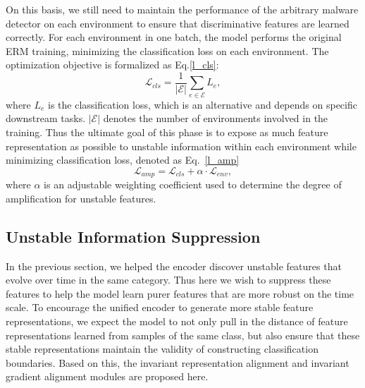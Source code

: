 On this basis, we still need to maintain the performance of the arbitrary malware detector on each environment to ensure that discriminative features are learned correctly. For each environment in one batch, the model performs the original ERM training, minimizing the classification loss on each environment. The optimization objective is formalized as Eq.\ref{l_cls}:
\begin{equation}
\label{l_cls}
\mathcal{L}_{cls} = \frac{1}{|\mathcal{E}|} \sum_{e \in \mathcal{E}} L_{e},
\end{equation}
where $L_{e}$ is the classification loss, which is an alternative and depends on specific downstream tasks. $|\mathcal{E}|$ denotes the number of environments involved in the training. Thus the ultimate goal of this phase is to expose as much feature representation as possible to unstable information within each environment while minimizing classification loss, denoted as Eq.~\ref{l_amp}
\begin{equation}
\label{l_amp}
\mathcal{L}_{amp} = \mathcal{L}_{cls} + \alpha \cdot \mathcal{L}_{env},
\end{equation}
where $\alpha$ is an adjustable weighting coefficient used to determine the degree of amplification for unstable features.

\subsection{Unstable Information Suppression}
In the previous section, we helped the encoder discover unstable features that evolve over time in the same category. Thus here we wish to suppress these features to help the model learn purer features that are more robust on the time scale. To encourage the unified encoder to generate more stable feature representations, we expect the model to not only pull in the distance of feature representations learned from samples of the same class, but also ensure that these stable representations maintain the validity of constructing classification boundaries. Based on this, the invariant representation alignment and invariant gradient alignment modules are proposed here.

